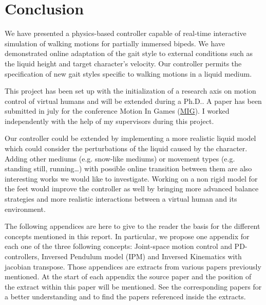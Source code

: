 \documentclass[runningheads,a4paper,10pt]{llncs}
\begin{document}
\section{Conclusion}
\label{sec:conclusion}

We have presented a physics-based controller capable of real-time interactive simulation of walking motions for partially immersed bipeds. We have demonstrated online adaptation of the gait style to external conditions such as the liquid height and target character's velocity. Our controller permits the specification of new gait styles specific to walking motions in a liquid medium.

This project has been set up with the initialization of a research axis on motion control of virtual humans and will be extended during a Ph.D.. A paper has been submitted in july for the conference Motion In Games (\href{https://mig2015.inria.fr}{MIG}). I worked independently with the help of my supervisors during this project.

Our controller could be extended by implementing a more realistic liquid model which could consider the perturbations of the liquid caused by the character. Adding other mediums (e.g. snow-like mediums) or movement types (e.g. standing still, running…) with possible online transition between them are also interesting works we would like to investigate. Working on a non rigid model for the feet would improve the controller as well by bringing more advanced balance strategies and more realistic interactions between a virtual human and its environment. 
 


\vspace{-2mm} %


\newpage

\appendix

The following appendices are here to give to the reader the basis for the different concepts mentioned in this report. In particular, we propose one appendix for each one of the three following concepts: Joint-space motion control and PD-controllers, Inversed Pendulum model (IPM) and Inversed Kinematics with jacobian transpose. Those appendices are extracts from various papers previously mentioned. At the start of each appendix the source paper and the position of the extract within this paper will be mentioned. See the corresponding papers for a better understanding and to find the papers referenced inside the extracts.
\end{document}
